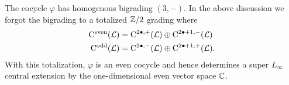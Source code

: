 The cocycle $\varphi$ has homogenous bigrading $(3,-)$.
In the above discussion we forgot the bigrading to a totalized $\mathbb Z/2$ grading where 
\begin{align*}
{\rm C}^\text{even} (\mathcal L) & = {\rm C}^{2\bullet , +} (\mathcal L) \oplus {\rm C}^{2\bullet+1, -}(\mathcal L) \\
{\rm C}^\text{odd} (\mathcal L) & = {\rm C}^{2\bullet , -} (\mathcal L) \oplus {\rm C}^{2\bullet+1, +}(\mathcal L) .
\end{align*}
With this totalization, $\varphi$ is an even cocycle and hence determines a super $L_\infty$ central extension by the one-dimensional even vector space $\mathbb C$. 



